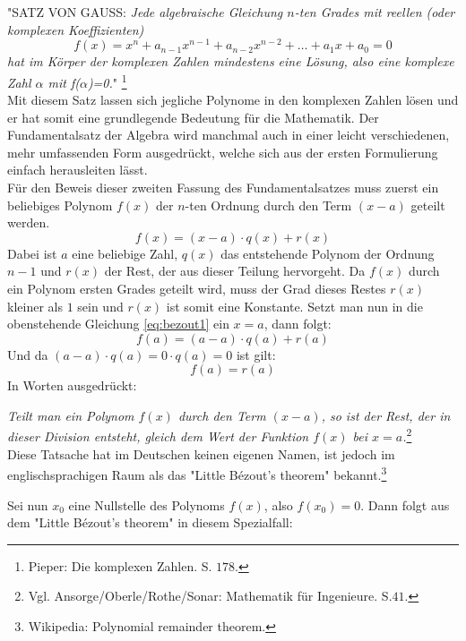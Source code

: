 \documentclass[a4paper,12pt]{article} %
\begin{document}
\noindent "\uppercase{Satz von Gauss:} \emph{Jede algebraische Gleichung $n$-ten Grades mit reellen (oder komplexen Koeffizienten)}
\begin{equation}\label{eq:funda}
		f(x)=x^n + a_{n-1}x^{n-1} + a_{n-2}x^{n-2} + \dots + a_1x + a_0 = 0
\end{equation} 
\noindent \emph{hat im Körper der komplexen Zahlen mindestens eine Lösung, also eine komplexe Zahl $\alpha$ mit f($\alpha$)=0.}"{} 
\footnote{Pieper: Die komplexen Zahlen. S. $178$.}\\

Mit diesem Satz lassen sich jegliche Polynome in den komplexen Zahlen lösen und er hat somit eine grundlegende Bedeutung für die Mathematik.
Der Fundamentalsatz der Algebra wird manchmal auch in einer leicht verschiedenen, mehr umfassenden Form ausgedrückt, welche sich aus der ersten Formulierung einfach herausleiten lässt.\\

Für den Beweis dieser zweiten Fassung des Fundamentalsatzes muss zuerst ein beliebiges Polynom $f(x)$ der $n$-ten Ordnung durch den Term $(x-a)$ geteilt werden.
\begin{equation}\label{eq:bezout1}
f(x) = (x - a) \cdot q(x) + r(x)
\end{equation} 
Dabei ist $a$ eine beliebige Zahl, $q(x)$ das entstehende Polynom der Ordnung $n-1$ und $r(x)$ der Rest, der aus dieser Teilung hervorgeht.
Da $f(x)$ durch ein Polynom ersten Grades geteilt wird, muss der Grad dieses Restes $r(x)$ kleiner als $1$ sein und $r(x)$ ist somit eine Konstante.
Setzt man nun in die obenstehende Gleichung \eqref{eq:bezout1} ein $x=a$, dann folgt:
\[ f(a) = (a-a) \cdot q(a) + r(a) \]
Und da $(a - a) \cdot q(a) = 0 \cdot q(a) = 0 $ ist gilt:
\[ f(a) = r(a) \]
In Worten ausgedrückt:

\noindent \emph{Teilt man ein Polynom $f(x)$ durch den Term $(x-a)$, so ist der Rest, der in dieser Division entsteht, gleich dem Wert der Funktion $f(x)$ bei $x=a$.}\footnote{Vgl. Ansorge/Oberle/Rothe/Sonar: Mathematik für Ingenieure. S.$41$.}\\

Diese Tatsache hat im Deutschen keinen eigenen Namen, ist jedoch im englischsprachigen Raum als das "Little Bézout's theorem" {} bekannt.\footnote{Wikipedia: Polynomial remainder theorem.}

Sei nun $x_0$ eine Nullstelle des Polynoms $f(x)$, also $f(x_0)=0$. Dann folgt aus dem "Little Bézout's theorem" {}in diesem Spezialfall:
\end{document}
